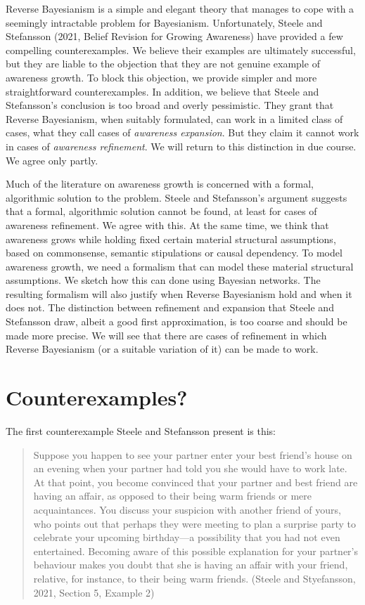 \documentclass[
  11pt,
  dvipsnames,enabledeprecatedfontcommands]{scrartcl}
\begin{document}
Reverse Bayesianism is a simple and elegant theory that manages to cope
with a seemingly intractable problem for Bayesianism. Unfortunately,
Steele and Stefansson (2021, Belief Revision for Growing Awareness) have
provided a few compelling counterexamples. We believe their examples are
ultimately successful, but they are liable to the objection that they
are not genuine example of awareness growth. To block this objection, we
provide simpler and more straightforward counterexamples. In addition,
we believe that Steele and Stefansson's conclusion is too broad and
overly pessimistic. They grant that Reverse Bayesianism, when suitably
formulated, can work in a limited class of cases, what they call cases
of \textit{awareness expansion}. But they claim it cannot work in cases
of \textit{awareness refinement}. We will return to this distinction in
due course. We agree only partly.

Much of the literature on awareness growth is concerned with a formal,
algorithmic solution to the problem. Steele and Stefansson's argument
suggests that a formal, algorithmic solution cannot be found, at least
for cases of awareness refinement. We agree with this. At the same time,
we think that awareness grows while holding fixed certain material
structural assumptions, based on commonsense, semantic stipulations or
causal dependency. To model awareness growth, we need a formalism that
can model these material structural assumptions. We sketch how this can
done using Bayesian networks. The resulting formalism will also justify
when Reverse Bayesianism hold and when it does not. The distinction
between refinement and expansion that Steele and Stefansson draw, albeit
a good first approximation, is too coarse and should be made more
precise. We will see that there are cases of refinement in which Reverse
Bayesianism (or a suitable variation of it) can be made to work.

\hypertarget{counterexamples}{%
\section{Counterexamples?}\label{counterexamples}}

The first counterexample Steele and Stefansson present is this:

\begin{quote}
Suppose you happen to see your partner enter your best friend's house on
an evening when your partner had told you she would have to work late.
At that point, you become convinced that your partner and best friend
are having an affair, as opposed to their being warm friends or mere
acquaintances. You discuss your suspicion with another friend of yours,
who points out that perhaps they were meeting to plan a surprise party
to celebrate your upcoming birthday---a possibility that you had not
even entertained. Becoming aware of this possible explanation for your
partner's behaviour makes you doubt that she is having an affair with
your friend, relative, for instance, to their being warm friends.
(Steele and Styefansson, 2021, Section 5, Example 2)
\end{quote}
\end{document}
